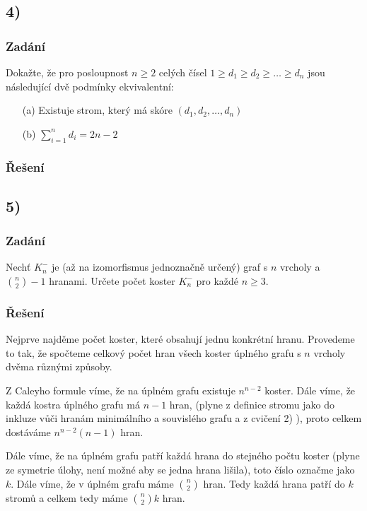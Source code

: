 \documentclass[../main.tex]{subfiles}
\begin{document}
\subsection*{4)}
\subsubsection*{Zadání}

Dokažte, že pro posloupnost $n\geq 2$ celých čísel 
$1\geq d_1\geq d_2 \geq \dots \geq d_n$ jsou následující
dvě podmínky ekvivalentní:
\begin{enumerate}
    \item[(a)] Existuje strom, který má skóre $(d_1, d_2, \dots, d_n)$
    \item[(b)] $\sum_{i=1}^n d_i = 2n - 2$
\end{enumerate}


\subsubsection*{Řešení}


\subsection*{5)}
\subsubsection*{Zadání}

Nechť $K_n^-$ je (až na izomorfismus jednoznačně určený) graf s $n$ vrcholy a $\binom{n}{2} -1$ hranami.
Určete počet koster $K_n^-$ pro každé $n\geq 3$.

\subsubsection*{Řešení}


Nejprve najděme počet koster, které obsahují jednu konkrétní hranu. 
Provedeme to tak, že spočteme celkový počet hran všech koster úplného grafu s $n$ vrcholy dvěma různými způsoby. 

Z Caleyho formule víme, že na úplném grafu existuje $n^{n-2}$ koster. Dále víme, že každá kostra úplného grafu má $n-1$ hran, 
(plyne z definice stromu jako do inkluze vůči hranám minimálního a souvislého grafu a z cvičení 2) ), proto celkem dostáváme $n^{n-2}(n-1)$ hran.

Dále víme, že na úplném grafu patří každá hrana do stejného počtu koster 
(plyne ze symetrie úlohy, není možné aby se jedna hrana lišila), toto číslo označme
jako $k$. Dále víme, že v úplném grafu máme $\binom{n}{2}$ hran. Tedy každá hrana patří do $k$ stromů a celkem tedy máme $\binom{n}{2}k$ hran.
\end{document}
